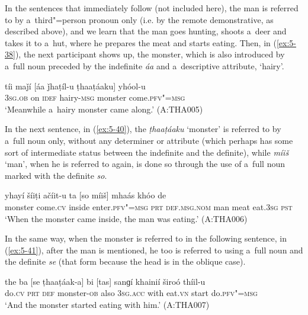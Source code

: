 In the sentences that immediately follow (not included here), the man is referred to by
a~third"=person pronoun only (i.e. by the remote demonstrative, as described above), and we learn
that the man goes hunting, shoots a~deer and takes it to a~hut, where he prepares the meat and
starts eating. Then, in (\ref{ex:5-38}), the next participant shows up, the monster, which is also
introduced by a~full noun preceded by the indefinite \textit{áa} and a~descriptive attribute,
`hairy'.
\begin{exe}
\ex
\label{ex:5-39}
\gll tíi maǰí [áa ǰhaṭíl-u ṭhaaṭáaku] yhóol-u\\
\textsc{3sg.ob} on \textsc{idef} hairy-\textsc{msg} monster come.\textsc{pfv"=msg}\\
\glt `Meanwhile a~hairy monster came along.' (A:THA005)
\end{exe}

In the next sentence, in (\ref{ex:5-40}), the \textit{ṭhaaṭáaku} `monster' is referred to by a~full noun
only, without any determiner or attribute (which perhaps has some sort of intermediate status
between the indefinite and the definite), while \textit{míiš} `man', when he is referred to
again, is done so through the use of a~full noun marked with the definite \textit{so}.
\begin{exe}
\ex
\label{ex:5-40}
\gll [ṭhaaṭáaku] yhayí šíiṭi ačíit-u ta [so míiš] mhaás khóo de\\
monster come.\textsc{cv} inside enter.\textsc{pfv"=msg} \textsc{prt} \textsc{def.msg.nom} man meat eat.\textsc{3sg} \textsc{pst}\\
\glt `When the monster came inside, the man was eating.' (A:THA006)
\end{exe}

In the same way, when the monster is referred to in the following sentence, in (\ref{ex:5-41}), after the man is mentioned, he too is referred to using a~full noun and the definite \textit{se} (that form because the head is in the oblique case).
\begin{exe}
\ex
\label{ex:5-41}
\gll the ba [se ṭhaaṭáak-a] bi [tas] sanɡí khainií široó thíil-u\\
do.\textsc{cv} \textsc{prt} \textsc{def} monster-\textsc{ob} also \textsc{3sg.acc} with eat.\textsc{vn} start do.\textsc{pfv"=msg}\\
\glt `And the monster started eating with him.' (A:THA007)
\end{exe}

